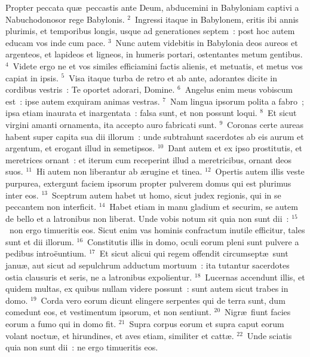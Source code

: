 \bchapter
\lettrine[lines=3,image=true,loversize=0.05,lraise=-0.03]{P}{}ropter peccata qu\ae\ peccastis ante Deum, abducemini in Babyloniam captivi a Nabuchodonosor rege Babylonis.
${}^{2}$~Ingressi itaque in Babylonem, eritis ibi annis plurimis, et temporibus longis, usque ad generationes septem~: post hoc autem educam vos inde cum pace.
${}^{3}$~Nunc autem videbitis in Babylonia deos aureos et argenteos, et lapideos et ligneos, in humeris portari, ostentantes metum gentibus.
${}^{4}$~Videte ergo ne et vos similes efficiamini factis alienis, et metuatis, et metus vos capiat in ipsis.
${}^{5}$~Visa itaque turba de retro et ab ante, adorantes dicite in cordibus vestris~: Te oportet adorari, Domine.
${}^{6}$~Angelus enim meus vobiscum est~: ipse autem exquiram animas vestras.
${}^{7}$~Nam lingua ipsorum polita a fabro~; ipsa etiam inaurata et inargentata~: falsa sunt, et non possunt loqui.
${}^{8}$~Et sicut virgini amanti ornamenta, ita accepto auro fabricati sunt.
${}^{9}$~Coronas certe aureas habent super capita sua dii illorum~: unde subtrahunt sacerdotes ab eis aurum et argentum, et erogant illud in semetipsos.
${}^{10}$~Dant autem et ex ipso prostitutis, et meretrices ornant~: et iterum cum receperint illud a meretricibus, ornant deos suos.
${}^{11}$~Hi autem non liberantur ab \ae rugine et tinea.
${}^{12}$~Opertis autem illis veste purpurea, extergunt faciem ipsorum propter pulverem domus qui est plurimus inter eos.
${}^{13}$~Sceptrum autem habet ut homo, sicut judex regionis, qui in se peccantem non interficit.
${}^{14}$~Habet etiam in manu gladium et securim, se autem de bello et a latronibus non liberat. Unde vobis notum sit quia non sunt dii~:
${}^{15}$~non ergo timueritis eos. Sicut enim vas hominis confractum inutile efficitur, tales sunt et dii illorum.
${}^{16}$~Constitutis illis in domo, oculi eorum pleni sunt pulvere a pedibus intro\"euntium.
${}^{17}$~Et sicut alicui qui regem offendit circumsept\ae\ sunt janu\ae , aut sicut ad sepulchrum adductum mortuum~: ita tutantur sacerdotes ostia clausuris et seris, ne a latronibus expolientur.
${}^{18}$~Lucernas accendunt illis, et quidem multas, ex quibus nullam videre possunt~: sunt autem sicut trabes in domo.
${}^{19}$~Corda vero eorum dicunt elingere serpentes qui de terra sunt, dum comedunt eos, et vestimentum ipsorum, et non sentiunt.
${}^{20}$~Nigr\ae\ fiunt facies eorum a fumo qui in domo fit.
${}^{21}$~Supra corpus eorum et supra caput eorum volant noctu\ae , et hirundines, et aves etiam, similiter et catt\ae .
${}^{22}$~Unde sciatis quia non sunt dii~: ne ergo timueritis eos.


